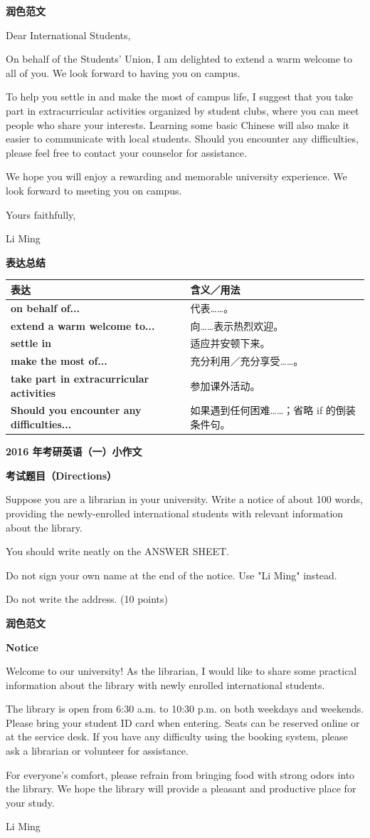 \documentclass[a4paper,12pt]{article}
\newcommand{\pageheading}[1]{%
  \begin{center}
    {\fontsize{16pt}{20pt}\selectfont\bfseries\color{navy}#1}
  \end{center}
  \vspace{2mm}
}
\newcommand{\sectionlabel}[1]{%
  \vspace{1.5mm}
  {\fontsize{11pt}{14pt}\selectfont\bfseries\color{navy}#1\par}
  \vspace{1mm}
}
\newenvironment{promptbox}{%
  \begin{tcolorbox}[colback=lightgray,colframe=rulegray,boxrule=.35pt,arc=.5mm,
  left=2.2mm,right=2.2mm,top=1.4mm,bottom=1.4mm,before skip=0pt,after skip=1mm]
  \fontsize{11pt}{13.4pt}\selectfont
  \RaggedRight
}{%
  \end{tcolorbox}
}
\newenvironment{essaybody}{%
  \fontsize{14pt}{20pt}\selectfont
  \RaggedRight
  \setlength{\parskip}{5pt}
}{\par}
\newcommand{\expressions}[1]{%
  \sectionlabel{表达总结}
  {\fontsize{10.8pt}{13.2pt}\selectfont
  \begin{tabularx}{\textwidth}{>{\RaggedRight\arraybackslash}p{0.46\textwidth} >{\RaggedRight\arraybackslash}X}
  \toprule
  \textbf{表达} & \textbf{含义／用法}\\
  \midrule
  #1
  \bottomrule
  \end{tabularx}}
}
\newcommand{\exprow}[2]{\textbf{#1} & #2\\}
\newcommand{\noticeissuer}[1]{%
  \par\vspace{2mm}\begin{flushright}\fontsize{14pt}{20pt}\selectfont #1\end{flushright}
}
\begin{document}
\sectionlabel{润色范文}
\begin{essaybody}
Dear International Students,

On behalf of the Students' Union, I am delighted to extend a warm welcome to all of you. We look forward to having you on campus.

To help you settle in and make the most of campus life, I suggest that you take part in extracurricular activities organized by student clubs, where you can meet people who share your interests. Learning some basic Chinese will also make it easier to communicate with local students. Should you encounter any difficulties, please feel free to contact your counselor for assistance.

We hope you will enjoy a rewarding and memorable university experience. We look forward to meeting you on campus.

Yours faithfully,

Li Ming
\end{essaybody}

\expressions{
\exprow{on behalf of...}{代表……。}
\exprow{extend a warm welcome to...}{向……表示热烈欢迎。}
\exprow{settle in}{适应并安顿下来。}
\exprow{make the most of...}{充分利用／充分享受……。}
\exprow{take part in extracurricular activities}{参加课外活动。}
\exprow{Should you encounter any difficulties...}{如果遇到任何困难……；省略 if 的倒装条件句。}
}

\newpage
\thispagestyle{fancy}
\pageheading{2016 年考研英语（一）小作文}
\sectionlabel{考试题目（Directions）}
\begin{promptbox}
Suppose you are a librarian in your university. Write a notice of about 100 words, providing the newly-enrolled international students with relevant information about the library.

You should write neatly on the ANSWER SHEET.

Do not sign your own name at the end of the notice. Use "Li Ming" instead.

Do not write the address. (10 points)
\end{promptbox}

\sectionlabel{润色范文}
\begin{essaybody}
\begin{center}
\textbf{Notice}
\end{center}
Welcome to our university! As the librarian, I would like to share some practical information about the library with newly enrolled international students.

The library is open from 6:30 a.m. to 10:30 p.m. on both weekdays and weekends. Please bring your student ID card when entering. Seats can be reserved online or at the service desk. If you have any difficulty using the booking system, please ask a librarian or volunteer for assistance.

For everyone's comfort, please refrain from bringing food with strong odors into the library. We hope the library will provide a pleasant and productive place for your study.
\noticeissuer{Li Ming}
\end{essaybody}
\end{document}
